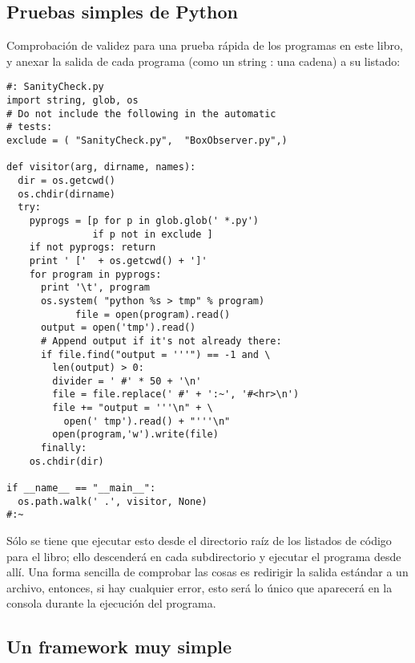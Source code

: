 \subsection*{ Pruebas simples de Python}
\label{subsec:spdp}


Comprobación de validez para una prueba rápida de los programas en este libro, y anexar la salida de cada programa (como un string : una cadena) a su listado:     \newline

 \begin{lstlisting} 
#: SanityCheck.py 
import string, glob, os 
# Do not include the following in the automatic 
# tests: 
exclude = ( "SanityCheck.py",  "BoxObserver.py",) 

def visitor(arg, dirname, names): 
  dir = os.getcwd() 
  os.chdir(dirname) 
  try: 
    pyprogs = [p for p in glob.glob(' *.py')  
               if p not in exclude ] 
    if not pyprogs: return 
    print ' ['  + os.getcwd() + ']' 
    for program in pyprogs: 
      print '\t', program 
      os.system( "python %s > tmp" % program) 
            file = open(program).read() 
      output = open('tmp').read() 
      # Append output if it's not already there: 
      if file.find("output = '''") == -1 and \ 
        len(output) > 0: 
        divider = ' #' * 50 + '\n' 
        file = file.replace(' #' + ':~', '#<hr>\n') 
        file += "output = '''\n" + \ 
          open(' tmp').read() + "'''\n" 
        open(program,'w').write(file) 
      finally: 
    os.chdir(dir) 
    
if __name__ == "__main__": 
  os.path.walk(' .', visitor, None) 
#:~     
 \end{lstlisting}

Sólo se tiene que ejecutar esto desde el directorio raíz de los listados de código para el libro; ello descenderá en cada subdirectorio y ejecutar el programa desde allí. Una forma sencilla de comprobar las cosas es redirigir la salida estándar a un archivo, entonces, si hay cualquier error, esto será lo único que aparecerá  en la consola durante la ejecución del programa. 

\subsection*{Un framework muy simple}
\label{subsec:ufms}

